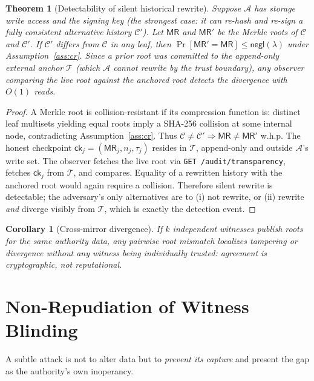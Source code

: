 \documentclass[11pt,a4paper]{article}
\theoremstyle{plain}
\newtheorem{theorem}{Theorem}
\newtheorem{corollary}{Corollary}
\theoremstyle{definition}
\theoremstyle{remark}
\newcommand{\Adv}{\mathcal{A}}
\newcommand{\negl}{\mathsf{negl}}
\newcommand{\code}[1]{\texttt{#1}}
\begin{document}
\begin{theorem}[Detectability of silent historical rewrite]
\label{thm:t3}
Suppose $\Adv$ has storage write access and the signing key (the
strongest case: it can re-hash and re-sign a fully consistent alternative
history $\mathcal{C}'$). Let $\mathsf{MR}$ and $\mathsf{MR}'$ be the
Merkle roots of $\mathcal{C}$ and $\mathcal{C}'$. If $\mathcal{C}'$
differs from $\mathcal{C}$ in any leaf, then
$\Pr[\mathsf{MR}'=\mathsf{MR}]\le\negl(\lambda)$ under
Assumption~\ref{ass:cr}. Since a prior root was committed to the
append-only external anchor $\mathcal{T}$ (which $\Adv$ cannot rewrite by
the trust boundary), any observer comparing the live root against the
anchored root detects the divergence with $O(1)$ reads.
\end{theorem}

\begin{proof}
A Merkle root is collision-resistant if its compression function is:
distinct leaf multisets yielding equal roots imply a SHA-256 collision
at some internal node, contradicting Assumption~\ref{ass:cr}. Thus
$\mathcal{C}\neq\mathcal{C}' \Rightarrow \mathsf{MR}\neq\mathsf{MR}'$
w.h.p. The honest checkpoint $\mathsf{ck}_j=(\mathsf{MR}_j,n_j,\tau_j)$
resides in $\mathcal{T}$, append-only and outside $\Adv$'s write set.
The observer fetches the live root via \code{GET /audit/transparency},
fetches $\mathsf{ck}_j$ from $\mathcal{T}$, and compares. Equality of a
rewritten history with the anchored root would again require a collision.
Therefore silent rewrite is detectable; the adversary's only
alternatives are to (i) not rewrite, or (ii) rewrite \emph{and} diverge
visibly from $\mathcal{T}$, which is exactly the detection event.
\end{proof}

\begin{corollary}[Cross-mirror divergence]
If $k$ independent witnesses publish roots for the same authority data,
any pairwise root mismatch localizes tampering or divergence without any
witness being individually trusted: agreement is cryptographic, not
reputational.
\end{corollary}

\section{Non-Repudiation of Witness Blinding}
\label{sec:outage}

A subtle attack is not to alter data but to \emph{prevent its capture}
and present the gap as the authority's own inoperancy.
\end{document}
